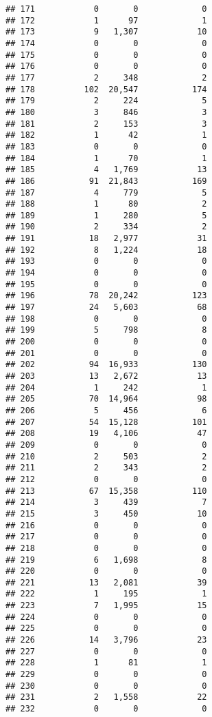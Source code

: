 \documentclass[
]{article}
\begin{document}
\begin{verbatim}
## 171            0       0             0
## 172            1      97             1
## 173            9   1,307            10
## 174            0       0             0
## 175            0       0             0
## 176            0       0             0
## 177            2     348             2
## 178          102  20,547           174
## 179            2     224             5
## 180            3     846             3
## 181            2     153             3
## 182            1      42             1
## 183            0       0             0
## 184            1      70             1
## 185            4   1,769            13
## 186           91  21,843           169
## 187            4     779             5
## 188            1      80             2
## 189            1     280             5
## 190            2     334             2
## 191           18   2,977            31
## 192            8   1,224            18
## 193            0       0             0
## 194            0       0             0
## 195            0       0             0
## 196           78  20,242           123
## 197           24   5,603            68
## 198            0       0             0
## 199            5     798             8
## 200            0       0             0
## 201            0       0             0
## 202           94  16,933           130
## 203           13   2,672            13
## 204            1     242             1
## 205           70  14,964            98
## 206            5     456             6
## 207           54  15,128           101
## 208           19   4,106            47
## 209            0       0             0
## 210            2     503             2
## 211            2     343             2
## 212            0       0             0
## 213           67  15,358           110
## 214            3     439             7
## 215            3     450            10
## 216            0       0             0
## 217            0       0             0
## 218            0       0             0
## 219            6   1,698             8
## 220            0       0             0
## 221           13   2,081            39
## 222            1     195             1
## 223            7   1,995            15
## 224            0       0             0
## 225            0       0             0
## 226           14   3,796            23
## 227            0       0             0
## 228            1      81             1
## 229            0       0             0
## 230            0       0             0
## 231            2   1,558            22
## 232            0       0             0

\end{verbatim}
\end{document}
